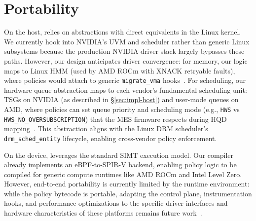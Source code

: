 \section{Portability}
\label{sec:discussion}


On the host, \sys relies on abstractions with direct equivalents in the Linux kernel. We currently hook into NVIDIA's UVM and scheduler rather than generic Linux subsystems because the production NVIDIA driver stack largely bypasses these paths. However, our design anticipates driver convergence: for memory, our logic maps to Linux HMM (used by AMD ROCm with XNACK retryable faults), where policies would attach to generic \texttt{migrate\_vma} hooks~\cite{rocm-gpu-memory,linux-gpusvm-doc}. For scheduling, our hardware queue abstraction maps to each vendor's fundamental scheduling unit: TSGs on NVIDIA (as described in \S\ref{sec:impl-host}) and user-mode queues on AMD, where policies can set queue priority and scheduling mode (e.g., \texttt{HWS} vs \texttt{HWS\_NO\_OVERSUBSCRIPTION}) that the MES firmware respects during HQD mapping~\cite{drm-gpu-sched,amdgpu-userq-doc}. This abstraction aligns with the Linux DRM scheduler's \texttt{drm\_sched\_entity} lifecycle, enabling cross-vendor policy enforcement.

On the device, \sys leverages the standard SIMT execution model. Our compiler already implements an eBPF-to-SPIR-V backend, enabling policy logic to be compiled for generic compute runtimes like AMD ROCm and Intel Level Zero. However, end-to-end portability is currently limited by the runtime environment: while the policy bytecode is portable, adapting the control plane, instrumentation hooks, and performance optimizations to the specific driver interfaces and hardware characteristics of these platforms remains future work~\cite{spirv-ir-rfc,llvm-offload-design}.